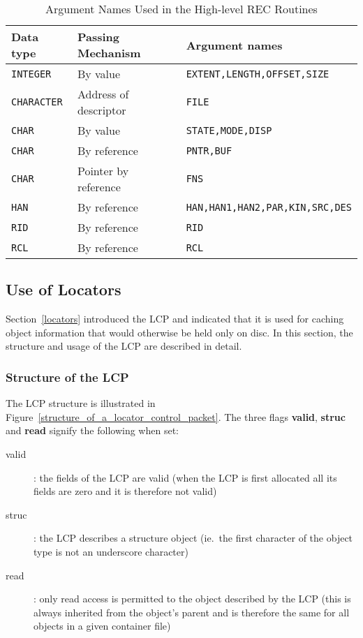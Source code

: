 \begin {table}[htbp]
\begin {center}
\begin {tabular}{||l|l|l||}
\hline
Data type	& Passing Mechanism	& Argument names \\
\hline
{\tt INTEGER}	& By value		& {\tt EXTENT,LENGTH,OFFSET,SIZE} \\
{\tt CHARACTER}	& Address of descriptor	& {\tt FILE} \\
{\tt CHAR}	& By value		& {\tt STATE,MODE,DISP} \\
{\tt CHAR}	& By reference		& {\tt PNTR,BUF} \\
{\tt CHAR}	& Pointer by reference	& {\tt FNS} \\
\hline
{\tt HAN}	& By reference		& {\tt HAN,HAN1,HAN2,PAR,KIN,SRC,DES} \\
{\tt RID}	& By reference		& {\tt RID} \\
{\tt RCL}	& By reference		& {\tt RCL} \\
\hline
\end {tabular}
\caption {Argument Names Used in the High-level REC Routines}
\label {argument_names_used_in_the_high_level_rec_routines}
\end {center}
\end {table}

\subsection {Use of Locators}
\label {use_of_locators}

Section~\ref{locators} introduced the LCP and indicated that it is used
for caching object information that would otherwise be held only on disc.
In this section, the structure and usage of the LCP are described in detail.

\subsubsection {Structure of the LCP}

The LCP structure is illustrated in
Figure~\ref{structure_of_a_locator_control_packet}. The three flags {\bf valid},
{\bf struc} and {\bf read} signify the following when set:

\begin {description}
\item [valid]: the fields of the LCP are valid (when the LCP is first allocated
all its fields are zero and it is therefore not valid)
\item [struc]: the LCP describes a structure object (ie.\ the first character
of the object type is not an underscore character)
\item [read]: only read access is permitted to the object described by the
LCP (this is always inherited from the object's parent and is therefore
the same for all objects in a given container file)
\end {description}

